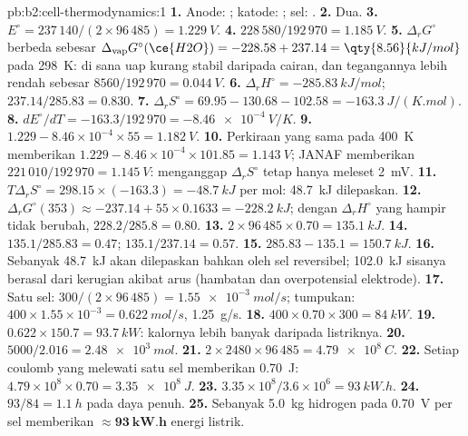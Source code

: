 \begin{solution}{pb:b2:cell-thermodynamics:1}
\textbf{1.} Anode: ; katode: ;
sel: .
\textbf{2.} Dua.
\textbf{3.} $E^\circ = 237\,140/(2 \times 96\,485) = \qty{1.229}{V}$.
\textbf{4.} $228\,580/192\,970 = \qty{1.185}{V}$.
\textbf{5.} $\Delta_r G^\circ$ berbeda sebesar
$\Delta_{\text{vap}}G^\circ(\ce{H2O}) = -228.58 + 237.14 =
\qty{8.56}{kJ/mol}$
pada \qty{298}{K}: di sana uap kurang stabil daripada cairan, dan
tegangannya lebih rendah sebesar $8560/192\,970 = \qty{0.044}{V}$.
\textbf{6.} $\Delta_r H^\circ = \qty{-285.83}{kJ/mol}$; $237.14/285.83 = 0.830$.
\textbf{7.} $\Delta_r S^\circ = 69.95 - 130.68 - 102.58 = \qty{-163.3}{J/(K.mol)}$.
\textbf{8.} $dE^\circ/dT = -163.3/192\,970 = \qty{-8.46e-4}{V/K}$.
\textbf{9.} $1.229 - 8.46 \times 10^{-4} \times 55 = \qty{1.182}{V}$.
\textbf{10.} Perkiraan yang sama pada \qty{400}{K} memberikan
$1.229 - 8.46 \times 10^{-4}
\times 101.85 = \qty{1.143}{V}$; JANAF
memberikan $221\,010/192\,970 = \qty{1.145}{V}$: menganggap
$\Delta_r S^\circ$ tetap hanya meleset \qty{2}{mV}.
\textbf{11.} $T\Delta_r S^\circ = 298.15 \times (-163.3) = \qty{-48.7}{kJ}$
per mol: \qty{48.7}{kJ} dilepaskan.
\textbf{12.} $\Delta_r G^\circ(353) \approx -237.14 + 55 \times 0.1633 =
\qty{-228.2}{kJ}$; dengan $\Delta_r H^\circ$ yang hampir tidak berubah,
$228.2/285.8 = 0.80$.
\textbf{13.} $2 \times 96\,485 \times 0.70 = \qty{135.1}{kJ}$.
\textbf{14.} $135.1/285.83 = 0.47$; $135.1/237.14 = 0.57$.
\textbf{15.} $285.83 - 135.1 = \qty{150.7}{kJ}$.
\textbf{16.} Sebanyak \qty{48.7}{kJ} akan dilepaskan bahkan oleh sel
reversibel; \qty{102.0}{kJ} sisanya berasal dari kerugian akibat arus
(hambatan dan overpotensial elektrode).
\textbf{17.} Satu sel: $300/(2 \times 96\,485) = \qty{1.55e-3}{mol/s}$;
tumpukan: $400 \times 1.55 \times 10^{-3} = \qty{0.622}{mol/s}$,
\qty{1.25}{g/s}.
\textbf{18.} $400 \times 0.70 \times 300 = \qty{84}{kW}$.
\textbf{19.} $0.622 \times 150.7 = \qty{93.7}{kW}$: kalornya lebih banyak
daripada listriknya.
\textbf{20.} $5000/2.016 = \qty{2.48e3}{mol}$.
\textbf{21.} $2 \times 2480 \times 96\,485 = \qty{4.79e8}{C}$.
\textbf{22.} Setiap coulomb yang melewati satu sel memberikan
\qty{0.70}{J}: $4.79 \times
10^8 \times 0.70 = \qty{3.35e8}{J}$.
\textbf{23.} $3.35 \times 10^8/3.6 \times 10^6 = \qty{93}{kW.h}$.
\textbf{24.} $93/84 = \qty{1.1}{h}$ pada daya penuh.
\textbf{25.} Sebanyak \qty{5.0}{kg} hidrogen pada \qty{0.70}{V} per sel
memberikan $\boldsymbol{\approx \qty{93}{kW.h}}$ energi listrik.
\end{solution}

